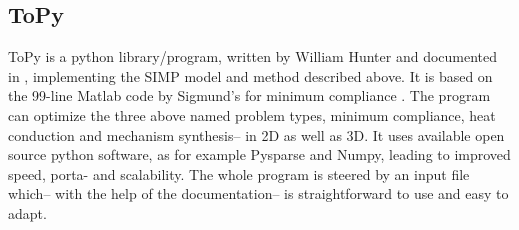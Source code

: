 \subsection{ToPy}\label{sec:ToPy}
ToPy \cite{ToPy} is a python library/program, written by William Hunter and documented in \cite{Hunter2009}, implementing the SIMP model and method described above. It is based on the 99-line Matlab code by Sigmund's for minimum compliance \cite{sigmund200199}. The program can optimize the three above named problem types, minimum compliance, heat conduction and mechanism synthesis-- in 2D as well as 3D. It uses available open source python software, as for example Pysparse and Numpy, leading to improved speed, porta- and scalability. The whole program is steered by an input file which-- with the help of the documentation-- is straightforward to use and easy to adapt. 

